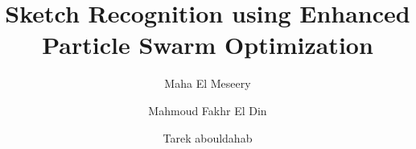 \documentclass[12pt,1p,times]{elsarticle}%
\begin{document}
\begin{frontmatter}

 


 
\title{Sketch Recognition using Enhanced Particle Swarm Optimization}

\author[Eri]{Maha El Meseery  }%
\author[Eri]{Mahmoud Fakhr El Din}
\author[metro]{Tarek abouldahab}

\address[Eri]{Signals Processing Group, Computers and Systems Department,
  Electronic Research Institute,Cairo, Egypt.}
  \address[metro]{Cairo Metro Company, Ministry of transport ,Cairo, Egypt.}

 
 \begin{abstract}


\end{abstract}
\end{frontmatter}
\end{document}
